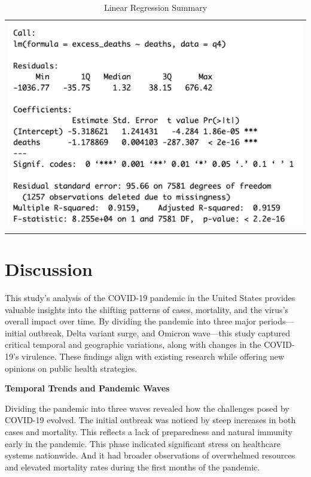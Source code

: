 \documentclass[
  letterpaper,
  DIV=11,
  numbers=noendperiod]{scrartcl}
\begin{document}
\begin{longtable}[]{@{}l@{}}
\caption{Linear Regression Summary}\tabularnewline
\toprule\noalign{}
\endfirsthead
\endhead
\bottomrule\noalign{}
\endlastfoot
\includegraphics{../docs/table1.jpg} \\
\end{longtable}

\section{Discussion}\label{discussion}

This study's analysis of the COVID-19 pandemic in the United States
provides valuable insights into the shifting patterns of cases,
mortality, and the virus's overall impact over time. By dividing the
pandemic into three major periods---initial outbreak, Delta variant
surge, and Omicron wave---this study captured critical temporal and
geographic variations, along with changes in the COVID-19's virulence.
These findings align with existing research while offering new opinions
on public health strategies.

\textbf{Temporal Trends and Pandemic Waves}

Dividing the pandemic into three waves revealed how the challenges posed
by COVID-19 evolved. The initial outbreak was noticed by steep increases
in both cases and mortality. This reflects a lack of preparedness and
natural immunity early in the pandemic. This phase indicated significant
stress on healthcare systems nationwide. And it had broader observations
of overwhelmed resources and elevated mortality rates during the first
months of the pandemic.
\end{document}

